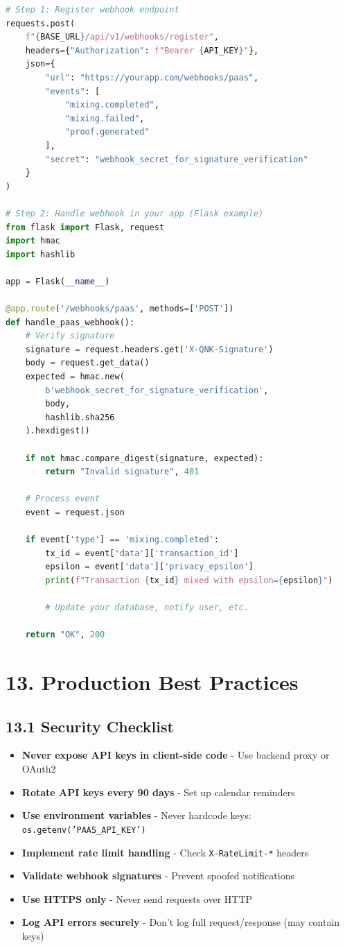 \documentclass[11pt,a4paper]{article}
\begin{document}
\begin{lstlisting}[language=python]
# Step 1: Register webhook endpoint
requests.post(
    f"{BASE_URL}/api/v1/webhooks/register",
    headers={"Authorization": f"Bearer {API_KEY}"},
    json={
        "url": "https://yourapp.com/webhooks/paas",
        "events": [
            "mixing.completed",
            "mixing.failed",
            "proof.generated"
        ],
        "secret": "webhook_secret_for_signature_verification"
    }
)

# Step 2: Handle webhook in your app (Flask example)
from flask import Flask, request
import hmac
import hashlib

app = Flask(__name__)

@app.route('/webhooks/paas', methods=['POST'])
def handle_paas_webhook():
    # Verify signature
    signature = request.headers.get('X-QNK-Signature')
    body = request.get_data()
    expected = hmac.new(
        b'webhook_secret_for_signature_verification',
        body,
        hashlib.sha256
    ).hexdigest()

    if not hmac.compare_digest(signature, expected):
        return "Invalid signature", 401

    # Process event
    event = request.json

    if event['type'] == 'mixing.completed':
        tx_id = event['data']['transaction_id']
        epsilon = event['data']['privacy_epsilon']
        print(f"Transaction {tx_id} mixed with epsilon={epsilon}")

        # Update your database, notify user, etc.

    return "OK", 200
\end{lstlisting}

\section{13. Production Best Practices}

\subsection{13.1 Security Checklist}

\begin{itemize}
    \item[$\square$] \textbf{Never expose API keys in client-side code} - Use backend proxy or OAuth2
    \item[$\square$] \textbf{Rotate API keys every 90 days} - Set up calendar reminders
    \item[$\square$] \textbf{Use environment variables} - Never hardcode keys: \texttt{os.getenv('PAAS\_API\_KEY')}
    \item[$\square$] \textbf{Implement rate limit handling} - Check \texttt{X-RateLimit-*} headers
    \item[$\square$] \textbf{Validate webhook signatures} - Prevent spoofed notifications
    \item[$\square$] \textbf{Use HTTPS only} - Never send requests over HTTP
    \item[$\square$] \textbf{Log API errors securely} - Don't log full request/response (may contain keys)
\end{itemize}
\end{document}
